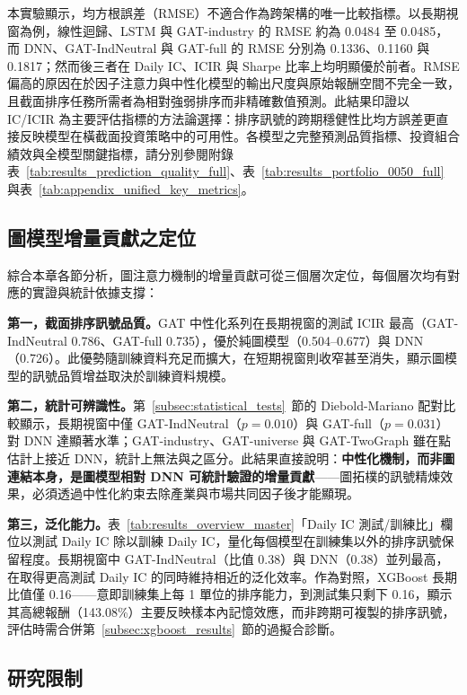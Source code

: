 本實驗顯示，均方根誤差（RMSE）不適合作為跨架構的唯一比較指標。以長期視窗為例，線性迴歸、LSTM 與 GAT-industry 的 RMSE 約為 0.0484 至 0.0485，而 DNN、GAT-IndNeutral 與 GAT-full 的 RMSE 分別為 0.1336、0.1160 與 0.1817；然而後三者在 Daily IC、ICIR 與 Sharpe 比率上均明顯優於前者。RMSE 偏高的原因在於因子注意力與中性化模型的輸出尺度與原始報酬空間不完全一致，且截面排序任務所需者為相對強弱排序而非精確數值預測。此結果印證以 IC/ICIR 為主要評估指標的方法論選擇：排序訊號的跨期穩健性比均方誤差更直接反映模型在橫截面投資策略中的可用性。各模型之完整預測品質指標、投資組合績效與全模型關鍵指標，請分別參閱附錄表~\ref{tab:results_prediction_quality_full}、表~\ref{tab:results_portfolio_0050_full} 與表~\ref{tab:appendix_unified_key_metrics}。

\subsection{圖模型增量貢獻之定位}
\label{subsec:graph_contribution}

綜合本章各節分析，圖注意力機制的增量貢獻可從三個層次定位，每個層次均有對應的實證與統計依據支撐：

\textbf{第一，截面排序訊號品質。}GAT 中性化系列在長期視窗的測試 ICIR 最高（GAT-IndNeutral 0.786、GAT-full 0.735），優於純圖模型（0.504--0.677）與 DNN（0.726）。此優勢隨訓練資料充足而擴大，在短期視窗則收窄甚至消失，顯示圖模型的訊號品質增益取決於訓練資料規模。

\textbf{第二，統計可辨識性。}第~\ref{subsec:statistical_tests}~節的 Diebold-Mariano 配對比較顯示，長期視窗中僅 GAT-IndNeutral（$p = 0.010$）與 GAT-full（$p = 0.031$）對 DNN 達顯著水準；GAT-industry、GAT-universe 與 GAT-TwoGraph 雖在點估計上接近 DNN，統計上無法與之區分。此結果直接說明：\textbf{中性化機制，而非圖連結本身，是圖模型相對 DNN 可統計驗證的增量貢獻}——圖拓樸的訊號精煉效果，必須透過中性化約束去除產業與市場共同因子後才能顯現。

\textbf{第三，泛化能力。}表~\ref{tab:results_overview_master}「Daily IC 測試/訓練比」欄位以測試 Daily IC 除以訓練 Daily IC，量化每個模型在訓練集以外的排序訊號保留程度。長期視窗中 GAT-IndNeutral（比值 0.38）與 DNN（0.38）並列最高，在取得更高測試 Daily IC 的同時維持相近的泛化效率。作為對照，XGBoost 長期比值僅 0.16——意即訓練集上每 1 單位的排序能力，到測試集只剩下 0.16，顯示其高總報酬（143.08\%）主要反映樣本內記憶效應，而非跨期可複製的排序訊號，評估時需合併第~\ref{subsec:xgboost_results}~節的過擬合診斷。

\subsection{研究限制}
\label{subsec:limitations}

